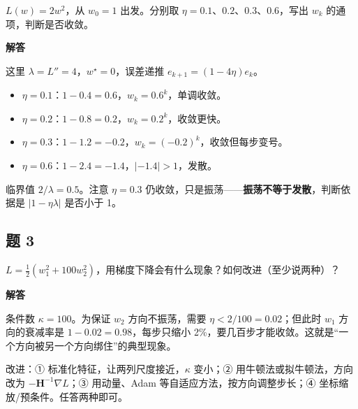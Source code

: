 \documentclass[UTF8, a4paper, zihao=-4, fontset=none]{ctexart}
\begin{document}
$L(w)=2w^2$，从 $w_0=1$ 出发。分别取 $\eta=0.1$、$0.2$、$0.3$、$0.6$，写出 $w_k$ 的通项，判断是否收敛。



\begin{answerbox}
{\bfseries\sffamily\small\color{accent} 解答}\par\vspace{2pt}
这里 $\lambda=L''=4$，$w^\star=0$，误差递推 $e_{k+1}=(1-4\eta)e_k$。


\begin{itemize}
\item $\eta=0.1$：$1-0.4=0.6$，$w_k=0.6^k$，单调收敛。
\item $\eta=0.2$：$1-0.8=0.2$，$w_k=0.2^k$，收敛更快。
\item $\eta=0.3$：$1-1.2=-0.2$，$w_k=(-0.2)^k$，收敛但每步变号。
\item $\eta=0.6$：$1-2.4=-1.4$，$|{-1.4}|>1$，发散。
\end{itemize}


临界值 $2/\lambda=0.5$。注意 $\eta=0.3$ 仍收敛，只是振荡——\textbf{振荡不等于发散}，判断依据是 $|1-\eta\lambda|$ 是否小于 1。


\end{answerbox}




\subsection*{题 3}



$L=\frac12(w_1^2+100w_2^2)$，用梯度下降会有什么现象？如何改进（至少说两种）？



\begin{answerbox}
{\bfseries\sffamily\small\color{accent} 解答}\par\vspace{2pt}
条件数 $\kappa=100$。为保证 $w_2$ 方向不振荡，需要 $\eta<2/100=0.02$；但此时 $w_1$ 方向的衰减率是 $1-0.02=0.98$，每步只缩小 2\%，要几百步才能收敛。这就是“一个方向被另一个方向绑住”的典型现象。


改进：① 标准化特征，让两列尺度接近，$\kappa$ 变小；② 用牛顿法或拟牛顿法，方向改为 $-\mathbf{H}^{-1}\nabla L$；③ 用动量、Adam 等自适应方法，按方向调整步长；④ 坐标缩放/预条件。任答两种即可。


\end{answerbox}
\end{document}
